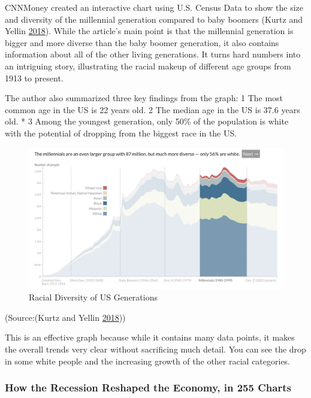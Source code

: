 \documentclass[]{book}
\theoremstyle{definition}
\theoremstyle{definition}
\theoremstyle{definition}
\theoremstyle{remark}
\begin{document}
CNNMoney created an interactive chart using U.S. Census Data to show the
size and diversity of the millennial generation compared to baby boomers
(Kurtz and Yellin \protect\hyperlink{ref-age_groups}{2018}). While the
article's main point is that the millennial generation is bigger and
more diverse than the baby boomer generation, it also contains
information about all of the other living generations. It turns hard
numbers into an intriguing story, illustrating the racial makeup of
different age groups from 1913 to present.

The author also summarized three key findings from the graph:
1\textbar{} The most common age in the US is 22 years old. 2\textbar{}
The median age in the US is 37.6 years old. * 3\textbar{} Among the
youngest generation, only 50\% of the population is white with the
potential of dropping from the biggest race in the US.

\begin{figure}
\centering
\includegraphics{images/millenials_diversity.png}
\caption{Racial Diversity of US Generations}
\end{figure}

(Source:(Kurtz and Yellin \protect\hyperlink{ref-age_groups}{2018}))

This is an effective graph because while it contains many data points,
it makes the overall trends very clear without sacrificing much detail.
You can see the drop in some white people and the increasing growth of
the other racial categories.

\subsubsection{How the Recession Reshaped the Economy, in 255
Charts}\label{how-the-recession-reshaped-the-economy-in-255-charts}
\end{document}
